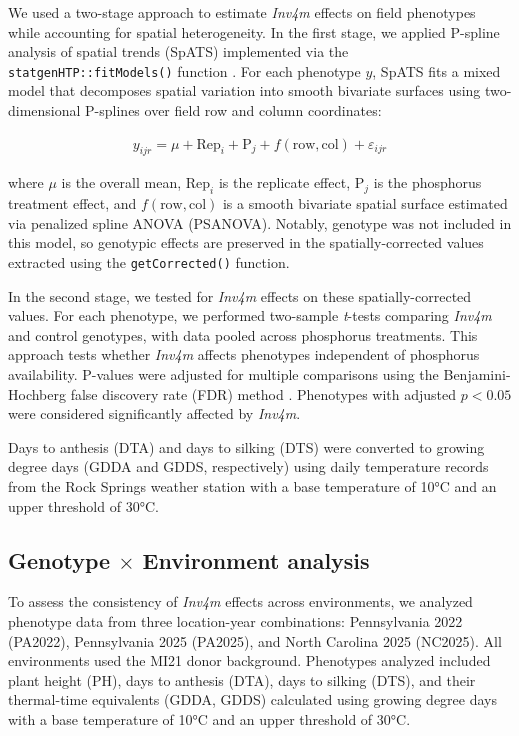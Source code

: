 \documentclass[9pt,twocolumn,twoside]{rilabRxiv}
\newcommand{\invfour}{\textit{Inv4m}\xspace}
\begin{document}
We used a two-stage approach to estimate \invfour effects on field phenotypes while accounting for spatial heterogeneity.
In the first stage, we applied P-spline analysis of spatial trends (SpATS) \cite{rodriguez-alvarez2018} implemented via the \texttt{statgenHTP::fitModels()} function \cite{millet2025}.
For each phenotype $y$, SpATS fits a mixed model that decomposes spatial variation into smooth bivariate surfaces using two-dimensional P-splines over field row and column coordinates:

\begin{eqnarray}
\label{eq:pheno_model}
y_{ijr} = \mu + \text{Rep}_i + \text{P}_j + f(\text{row}, \text{col}) + \varepsilon_{ijr}
\end{eqnarray}

where $\mu$ is the overall mean, $\text{Rep}_i$ is the replicate effect, $\text{P}_j$ is the phosphorus treatment effect, and $f(\text{row}, \text{col})$ is a smooth bivariate spatial surface estimated via penalized spline ANOVA (PSANOVA).
Notably, genotype was not included in this model, so genotypic effects are preserved in the spatially-corrected values extracted using the \texttt{getCorrected()} function.

In the second stage, we tested for \invfour effects on these spatially-corrected values.
For each phenotype, we performed two-sample \textit{t}-tests comparing \invfour and control genotypes, with data pooled across phosphorus treatments.
This approach tests whether \invfour affects phenotypes independent of phosphorus availability.
P-values were adjusted for multiple comparisons using the Benjamini-Hochberg false discovery rate (FDR) method \cite{benjamini1995}.
Phenotypes with adjusted $p < 0.05$ were considered significantly affected by \invfour.

Days to anthesis (DTA) and days to silking (DTS) were converted to growing degree days (GDDA and GDDS, respectively) using daily temperature records from the Rock Springs weather station with a base temperature of 10°C and an upper threshold of 30°C.

\subsection{Genotype $\times$ Environment analysis}

To assess the consistency of \invfour effects across environments, we analyzed phenotype data from three location-year combinations: Pennsylvania 2022 (PA2022), Pennsylvania 2025 (PA2025), and North Carolina 2025 (NC2025).
All environments used the MI21 donor background.
Phenotypes analyzed included plant height (PH), days to anthesis (DTA), days to silking (DTS), and their thermal-time equivalents (GDDA, GDDS) calculated using growing degree days with a base temperature of 10°C and an upper threshold of 30°C.
\end{document}
